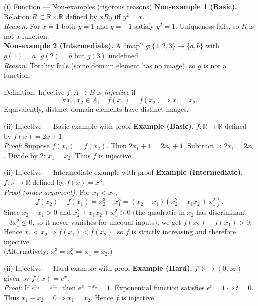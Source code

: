 \documentclass[11pt]{beamer}
\theoremstyle{plain}
\begin{document}
\begin{frame}{(i) Function — Non-examples (rigorous reasons)}
  \textbf{Non-example 1 (Basic).} Relation \(R\subset\mathbb{R}\times\mathbb{R}\) defined by \(xRy\) iff \(y^2=x\).\\
  \pause
  \emph{Reason:} For \(x=1\) both \(y=1\) and \(y=-1\) satisfy \(y^2=1\). Uniqueness fails, so \(R\) is not a function.\\[8pt]
  \pause
  \textbf{Non-example 2 (Intermediate).} A ``map'' \(g\colon\{1,2,3\}\to\{a,b\}\) with \(g(1)=a,\ g(2)=b\) but \(g(3)\) undefined.\\
  \emph{Reason:} Totality fails (some domain element has no image), so \(g\) is not a function.
\end{frame}

\begin{frame}{Definition: Injective}
  \(f\colon A\to B\) is \emph{injective} if
  \[
    \forall x_1,x_2\in A,\quad f(x_1)=f(x_2)\Rightarrow x_1=x_2.
  \]
  Equivalently, distinct domain elements have distinct images.
\end{frame}

\begin{frame}{(ii) Injective — Basic example with proof}
  \textbf{Example (Basic).} \(f\colon\mathbb{R}\to\mathbb{R}\) defined by \(f(x)=2x+1\).\\[6pt]
  \pause
  \emph{Proof:} Suppose \(f(x_1)=f(x_2)\). Then \(2x_1+1=2x_2+1\). Subtract \(1\): \(2x_1=2x_2\). Divide by \(2\): \(x_1=x_2\). Thus \(f\) is injective.
\end{frame}

\begin{frame}{(ii) Injective — Intermediate example with proof}
  \textbf{Example (Intermediate).} \(f\colon\mathbb{R}\to\mathbb{R}\) defined by \(f(x)=x^3\).\\[6pt]
  \pause
  \emph{Proof (order argument).} For \(x_1<x_2\),
  \[
    f(x_2)-f(x_1)=x_2^3-x_1^3=(x_2-x_1)(x_2^2+x_1x_2+x_1^2).
  \]
  Since \(x_2-x_1>0\) and \(x_2^2+x_1x_2+x_1^2>0\) (the quadratic in \(x_2\) has discriminant \(-3x_1^2\le 0\), so it never vanishes for unequal inputs), we get \(f(x_2)-f(x_1)>0\). Hence \(x_1<x_2\Rightarrow f(x_1)<f(x_2)\), so \(f\) is strictly increasing and therefore injective.\\
  (Alternatively: \(x_1^3=x_2^3\Rightarrow x_1=x_2\).)
\end{frame}

\begin{frame}{(ii) Injective — Hard example with proof}
  \textbf{Example (Hard).} \(f\colon\mathbb{R}\to(0,\infty)\) given by \(f(x)=e^x\).\\[6pt]
  \pause
  \emph{Proof:} If \(e^{x_1}=e^{x_2}\), then \(e^{x_1-x_2}=1\). Exponential function satisfies \(e^t=1\iff t=0\). Thus \(x_1-x_2=0\Rightarrow x_1=x_2\). Hence \(f\) is injective.
\end{frame}
\end{document}
